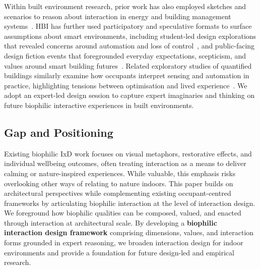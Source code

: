 Within built environment research, prior work has also  employed sketches and scenarios to reason about interaction in energy and building management systems~\cite{rodden2013home, pschetz2019autonomous}. HBI has further used participatory and speculative formats to surface assumptions about smart environments, including student-led design explorations that revealed concerns around automation and loss of control~\cite{mitchell2020no}, and public-facing design fiction events that foregrounded everyday expectations, scepticism, and values around smart building futures~\cite{paraschivoiu2023postcards, economidou2023engaging}. Related exploratory studies of quantified buildings similarly examine how occupants interpret sensing and automation in practice, highlighting tensions between optimisation and lived experience~\cite{margariti2023understanding}. We adopt an expert-led design session to capture expert imaginaries and thinking on future biophilic interactive experiences in built environments. 

\subsection{Gap and Positioning}
Existing biophilic IxD work focuses on visual metaphors, restorative effects, and individual wellbeing outcomes, often treating interaction as a means to deliver calming or nature-inspired experiences. While valuable, this emphasis risks overlooking other ways of relating to nature indoors. This paper builds on architectural perspectives while complementing existing occupant-centred frameworks by articulating biophilic interaction at the level of interaction design. We foreground how biophilic qualities can be composed, valued, and enacted through interaction at architectural scale. By developing a \textbf{biophilic interaction design framework} comprising dimensions, values, and interaction forms grounded in expert reasoning, we broaden interaction design for indoor environments and provide a foundation for future design-led and empirical research.
